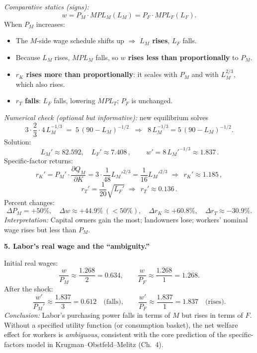 \documentclass[12pt]{article}
\begin{document}
\emph{Comparative statics (signs):}
\[
w = P_M \cdot MPL_M(L_M) = P_F \cdot MPL_F(L_F).
\]
When $P_M$ increases:
\begin{itemize}
\item The $M$-side wage schedule shifts up $\Rightarrow$ \textbf{$L_M$ rises}, $L_F$ falls.
\item Because $L_M$ rises, $MPL_M$ falls, so \textbf{$w$ rises less than proportionally} to $P_M$.
\item \textbf{$r_K$ rises more than proportionally}: it scales with $P_M$ and with $L_M^{2/3}$, which also rises.
\item \textbf{$r_T$ falls}: $L_F$ falls, lowering $MPL_T$; $P_F$ is unchanged.
\end{itemize}

\emph{Numerical check (optional but informative):} new equilibrium solves
\[
3 \cdot \frac{2}{3}\cdot 4 \, L_M^{-1/3} \;=\; 5 \,(90-L_M)^{-1/2}
\;\;\Rightarrow\;\;
8\, L_M^{-1/3} = 5 \,(90-L_M)^{-1/2}.
\]
Solution:
\[
\boxed{\,L_M' \approx 82.592,\quad L_F' \approx 7.408\,},\qquad
\boxed{\,w' = 8\,L_M'^{-1/3} \approx 1.837\,}.
\]
Specific-factor returns:
\[
r_K' = P_M' \cdot \frac{\partial Q_M}{\partial K}
= 3 \cdot \frac{1}{48} L_M'^{2/3}
= \frac{1}{16} L_M'^{2/3}
\;\Rightarrow\; \boxed{\,r_K' \approx 1.185\,},
\]
\[
r_T' = \frac{1}{20}\sqrt{L_F'}
\;\Rightarrow\; \boxed{\,r_T' \approx 0.136\,}.
\]
Percent changes:
\[
\Delta P_M = +50\%,\quad 
\Delta w \approx +44.9\% \ (<50\%),\quad
\Delta r_K \approx +60.8\%,\quad
\Delta r_T \approx -30.9\%.
\]
\textit{Interpretation:} Capital owners gain the most; landowners lose; workers’ nominal wage rises but less than $P_M$.

\bigskip

\noindent \textbf{5. Labor’s real wage and the “ambiguity.”}

Initial real wages:
\[
\frac{w}{P_M} \approx \frac{1.268}{2} = 0.634,
\qquad
\frac{w}{P_F} \approx \frac{1.268}{1} = 1.268.
\]
After the shock:
\[
\frac{w'}{P_M'} \approx \frac{1.837}{3} = 0.612 \quad \text{(falls)},
\qquad
\frac{w'}{P_F} \approx \frac{1.837}{1} = 1.837 \quad \text{(rises)}.
\]
\textit{Conclusion:} Labor’s purchasing power falls in terms of $M$ but rises in terms of $F$. Without a specified utility function (or consumption basket), the net welfare effect for workers is \emph{ambiguous}, consistent with the core prediction of the specific-factors model in Krugman--Obstfeld--Melitz (Ch.~4).
\end{document}

